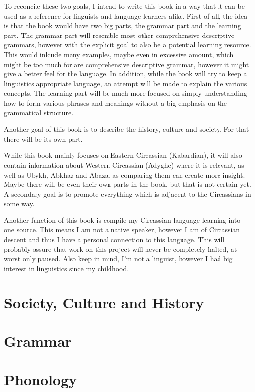 \documentclass[a4paper, 10pt]{book}
\begin{document}
To reconcile these two goals, I intend to write this book in a way that it can be used as a reference for linguists and language learners alike. First of all, the idea is that the book would have two big parts, the grammar part and the learning part. The grammar part will resemble most other comprehensive descriptive grammars, however with the explicit goal to also be a potential learning resource. This would inlcude many examples, maybe even in excessive amount, which might be too much for are comprehensive descriptive grammar, however it might give a better feel for the language. In addition, while the book will try to keep a linguistics appropriate language, an attempt will be made to explain the various concepts. The learning part will be much more focused on simply understanding how to form various phrases and meanings without a big emphasis on the grammatical structure.

Another goal of this book is to describe the history, culture and society. For that there will be its own part.

While this book mainly focuses on Eastern Circassian (Kabardian), it will also contain information about Western Circassian (Adyghe) where it is relevant, as well as Ubykh, Abkhaz and Abaza, as comparing them can create more insight. Maybe there will be even their own parts in the book, but that is not certain yet. A secondary goal is to promote everything which is adjacent to the Circassians in some way.

Another function of this book is compile my Circassian language learning into one source. This means I am not a native speaker, however I am of Circassian descent and thus I have a personal connection to this language. This will probably assure that work on this project will never be completely halted, at worst only paused. Also keep in mind, I'm not a linguist, however I had big interest in linguistics since my childhood.

\part{Society, Culture and History}

\part{Grammar}
\part{Phonology}
\end{document}
